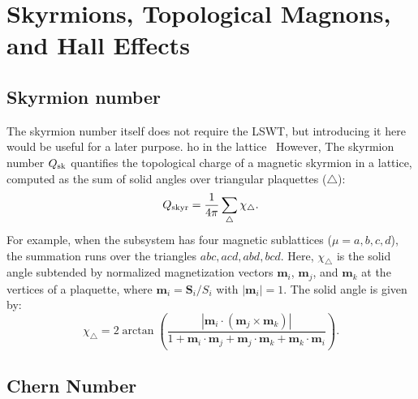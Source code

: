 \section{Skyrmions, Topological Magnons, and Hall Effects}

\subsection{Skyrmion number}\label{subsec: Skyrmion number}

The skyrmion number itself does not require the LSWT, but introducing it here would be useful for a later purpose. 
ho in the lattice~\cite{BERG1981412} 
However,
The skyrmion number $Q_{\rm sk}$ quantifies the topological charge of a magnetic skyrmion in a lattice, computed as the sum of solid angles over triangular plaquettes ($\triangle$):
\begin{equation}
    Q_{\rm skyr} 
    = \frac{1}{4\pi} \sum_{\triangle} \chi_{\triangle}.
\end{equation}
For example, when the subsystem has four magnetic sublattices ($\mu = a, b, c, d$), the summation runs over the triangles $abc, acd, abd, bcd$.
Here, $\chi_{\triangle}$ is the solid angle subtended by normalized magnetization vectors $\mathbf{m}_i$, $\mathbf{m}_j$, and $\mathbf{m}_k$ at the vertices of a plaquette, where $\mathbf{m}_i = \mathbf{S}_i / S_i$ with $|\mathbf{m}_i| = 1$. The solid angle is given by:
\begin{equation}
    \chi_{\triangle} 
    = 2 \arctan 
    \left( 
    \frac{|\mathbf{m}_i \cdot (\mathbf{m}_j \times \mathbf{m}_k)|}{1 + \mathbf{m}_i \cdot \mathbf{m}_j + \mathbf{m}_j \cdot \mathbf{m}_k + \mathbf{m}_k \cdot \mathbf{m}_i} 
    \right).
\end{equation}





\subsection{Chern Number}\label{subsec: Chern number}

